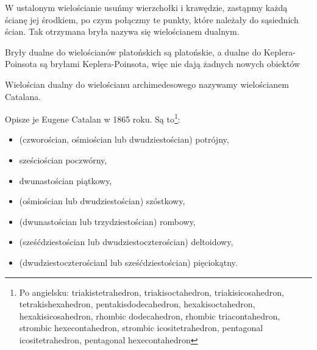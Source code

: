 %

\begin{definition}
    W ustalonym wielościanie usuńmy wierzchołki i krawędzie, zastąpmy każdą ścianę jej środkiem, po czym połączmy te punkty, które należały do sąsiednich ścian.
    Tak otrzymana bryła nazywa się wielościanem dualnym.
\end{definition}

Bryły dualne do wielościanów platońskich są platońskie, a dualne do Keplera-Poinsota są bryłami Keplera-Poinsota, więc nie dają żadnych nowych obiektów

\begin{definition}
    Wielościan dualny do wielościanu archimedesowego nazywamy wielościanem Catalana.
\end{definition}

Opisze je Eugene Catalan w 1865 roku.
Są to\footnote{\raggedright{Po angielsku: triakistetrahedron, triakisoctahedron, triakisicosahedron, tetrakishexahedron, pentakisdodecahedron, hexakisoctahedron, hexakisicosahedron, rhombic dodecahedron, rhombic triacontahedron, strombic hexecontahedron, strombic icositetrahedron, pentagonal icositetrahedron, pentagonal hexecontahedron}}:
 
\begin{itemize}
\item (czworościan, ośmiościan lub dwudziestościan) potrójny,
\item sześciościan poczwórny,
\item dwunastościan piątkowy,
\item (ośmiościan lub dwudziestościan) szóstkowy,
\item (dwunastościan lub trzydziestościan) rombowy,
\item (sześćdziestościan lub dwudziestoczterościan) deltoidowy,
\item (dwudziestoczterościanl lub sześćdziestościan) pięciokątny.
\end{itemize}

%